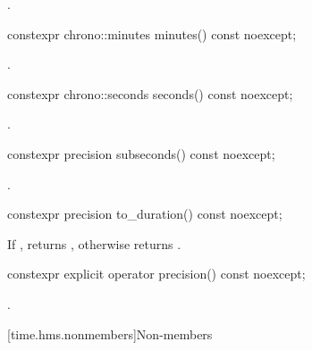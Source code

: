 \begin{itemdescr}
\pnum
\returns
{}.
\end{itemdescr}

%
\begin{itemdecl}
constexpr chrono::minutes minutes() const noexcept;
\end{itemdecl}

\begin{itemdescr}
\pnum
\returns
{}.
\end{itemdescr}

%
\begin{itemdecl}
constexpr chrono::seconds seconds() const noexcept;
\end{itemdecl}

\begin{itemdescr}
\pnum
\returns
{}.
\end{itemdescr}

%
\begin{itemdecl}
constexpr precision subseconds() const noexcept;
\end{itemdecl}

\begin{itemdescr}
\pnum
\returns
{}.
\end{itemdescr}

%
\begin{itemdecl}
constexpr precision to_duration() const noexcept;
\end{itemdecl}

\begin{itemdescr}
\pnum
\returns
If , returns ,
otherwise returns .
\end{itemdescr}

%
\begin{itemdecl}
constexpr explicit operator precision() const noexcept;
\end{itemdecl}

\begin{itemdescr}
\pnum
\returns
{}.
\end{itemdescr}

[time.hms.nonmembers]{Non-members}

